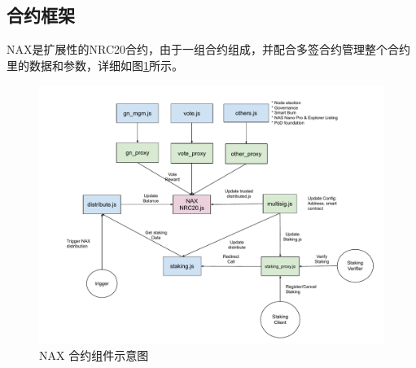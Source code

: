 \subsection{合约框架}
NAX是扩展性的NRC20合约，由于一组合约组成，并配合多签合约管理整个合约里的数据和参数，详细如图\ref{fig:nax_framework}所示。

\begin{figure}[htbp]
  \centering
    \includegraphics[width=1\textwidth]{../common/nax.pdf}
    \caption{NAX 合约组件示意图 \label{fig:nax_framework}}
\end{figure}
